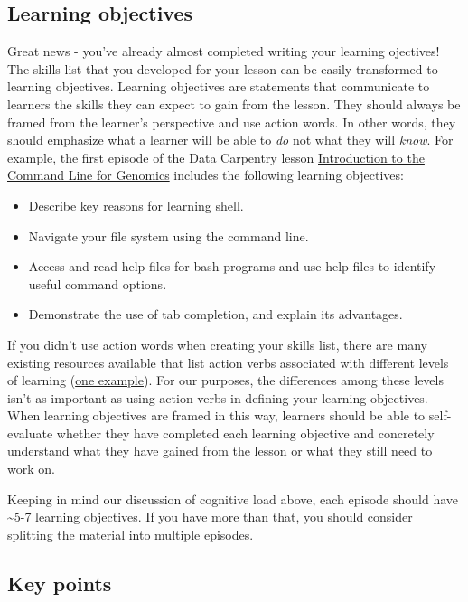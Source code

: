 \documentclass[]{book}
\providecommand{\tightlist}{%
  \setlength{\itemsep}{0pt}\setlength{\parskip}{0pt}}
\begin{document}
\hypertarget{learning-objectives}{%
\subsection{Learning objectives}\label{learning-objectives}}

Great news - you've already almost completed writing your learning ojectives! The skills list that you developed
for your lesson can be easily transformed to learning objectives. Learning objectives are statements that
communicate to learners the skills they can expect to gain from the lesson. They should always be framed
from the learner's perspective and use action words. In other words, they should emphasize what a learner
will be able to \emph{do} not what they will \emph{know}. For example, the first episode of the Data Carpentry lesson \href{https://datacarpentry.org/shell-genomics/}{Introduction to the Command Line for Genomics} includes the
following learning objectives:

\begin{itemize}
\tightlist
\item
  Describe key reasons for learning shell.
\item
  Navigate your file system using the command line.
\item
  Access and read help files for bash programs and use help files to identify useful command options.
\item
  Demonstrate the use of tab completion, and explain its advantages.
\end{itemize}

If you didn't use action words when creating your skills list, there are many existing resources available that
list action verbs associated with different levels of learning (\href{https://tips.uark.edu/blooms-taxonomy-verb-chart/}{one example}). For our purposes, the differences among these
levels isn't as important as using action verbs in defining your learning objectives. When learning objectives
are framed in this way, learners should be able to self-evaluate whether they have completed each learning
objective and concretely understand what they have gained from the lesson or what they still need to work on.

Keeping in mind our discussion of cognitive load above, each episode should have \textasciitilde{}5-7 learning objectives. If you
have more than that, you should consider splitting the material into multiple episodes.

\hypertarget{key-points}{%
\subsection{Key points}\label{key-points}}
\end{document}
